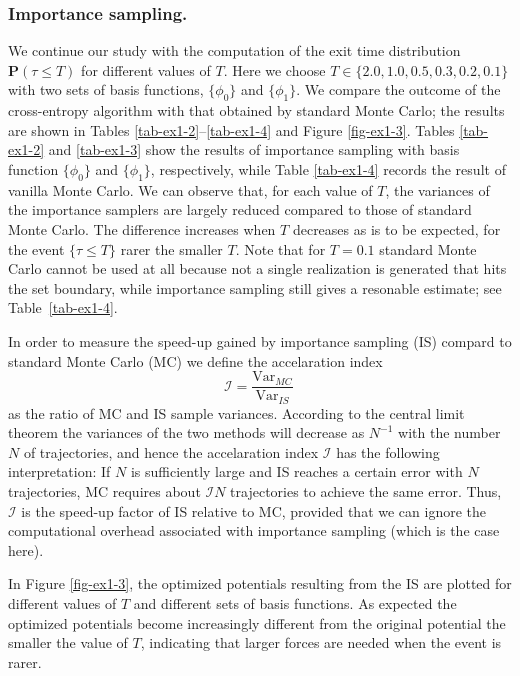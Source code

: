 \documentclass[final]{siamltex}
\newcommand{\cI}{{\mathcal I}}
\newcommand{\bP}{{\mathbf P}}
\begin{document}

\subsubsection*{Importance sampling.}

We continue our study with the computation of the exit time distribution
$\bP(\tau \le T)$ for different values of $T$. Here we choose $T \in\{2.0,
1.0, 0.5, 0.3, 0.2, 0.1\}$ with two sets of basis functions, $\{\phi_0\}$
and $\{\phi_1\}$. We compare the outcome of the cross-entropy algorithm with that obtained by 
standard Monte Carlo; the results are shown in 
Tables \ref{tab-ex1-2}--\ref{tab-ex1-4} and Figure \ref{fig-ex1-3}.
Tables \ref{tab-ex1-2} and \ref{tab-ex1-3} show the results of
importance sampling with basis function $\{\phi_0\}$ and $\{\phi_1\}$,
respectively, while Table \ref{tab-ex1-4} records the result of vanilla Monte Carlo. 
We can observe that, for each value of $T$, the variances of the importance
samplers are largely reduced compared to those of standard Monte Carlo. The
difference increases when $T$ decreases as is to be expected, for the event
$\{\tau\le T\}$ rarer the smaller $T$. Note that for $T=0.1$ standard Monte Carlo cannot be used at all because not a single realization is  generated that hits the set boundary, while importance sampling still gives a resonable estimate; see Table~\ref{tab-ex1-4}.

In order to measure the speed-up gained by importance sampling (IS) compard to standard Monte Carlo (MC) we define the accelaration index 
\begin{equation}
\cI=\frac{\textrm{Var}_{MC}}{\textrm{Var}_{IS}}\,
\end{equation}
as the ratio of MC and IS sample variances. According to the central limit theorem the variances of the two methods will decrease as $N^{-1}$ with the number $N$ of trajectories, and hence the accelaration index $\cI$ has the following interpretation: If $N$ is sufficiently large and IS reaches a certain error with $N$ trajectories, MC requires about $\cI N$ trajectories to achieve the same error. Thus, $\cI$ is the speed-up factor of IS relative to MC, provided that we can ignore the computational overhead associated with importance sampling (which is the case here). 

In Figure \ref{fig-ex1-3}, the optimized potentials resulting from the IS 
are plotted for different values of $T$ and different sets of basis functions. As expected 
the optimized potentials become increasingly different from the original 
potential the smaller the value of $T$, indicating that larger forces are needed when the event is rarer.
\end{document}
